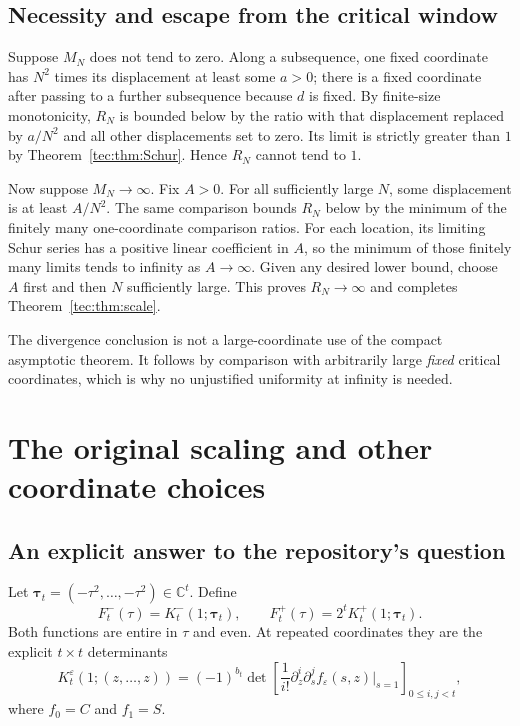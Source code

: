 \documentclass[11pt,a4paper]{article}
\numberwithin{equation}{section}
\theoremstyle{definition}
\theoremstyle{remark}
\newcommand{\CC}{\mathbb C}
\begin{document}
\subsection{Necessity and escape from the critical window}
Suppose $M_N$ does not tend to zero. Along a subsequence, one fixed
coordinate has $N^2$ times its displacement at least some $a>0$;
there is a fixed coordinate after passing to a further subsequence
because $d$ is fixed. By finite-size monotonicity, $R_N$ is bounded
below by the ratio with that displacement replaced by $a/N^2$ and
all other displacements set to zero. Its limit is strictly greater
than $1$ by Theorem~\ref{tec:thm:Schur}. Hence $R_N$ cannot tend to $1$.

Now suppose $M_N\to\infty$. Fix $A>0$. For all sufficiently large $N$,
some displacement is at least $A/N^2$. The same comparison bounds
$R_N$ below by the minimum of the finitely many one-coordinate comparison
ratios. For each location, its limiting Schur series has a positive
linear coefficient in $A$, so the minimum of those finitely many limits
tends to infinity as $A\to\infty$. Given any desired lower bound,
choose $A$ first and then $N$ sufficiently large. This proves
$R_N\to\infty$ and completes Theorem~\ref{tec:thm:scale}.

The divergence conclusion is not a large-coordinate use of the compact
asymptotic theorem. It follows by comparison with arbitrarily large
\emph{fixed} critical coordinates, which is why no unjustified uniformity
at infinity is needed.

\section{The original scaling and other coordinate choices}\label{tec:sec:original}
\subsection{An explicit answer to the repository's question}
Let $\boldsymbol\tau_t=(-\tau^2,\ldots,-\tau^2)\in\CC^t$. Define
\begin{equation}\label{tec:eq:Ft}
 F_t^-(\tau)=K_t^-(1;\boldsymbol\tau_t),\qquad
 F_t^+(\tau)=2^t K_t^+(1;\boldsymbol\tau_t).
\end{equation}
Both functions are entire in $\tau$ and even. At repeated coordinates
they are the explicit $t\times t$ determinants
\begin{equation}\label{tec:eq:repeatedkernel}
 K_t^\varepsilon(1;(z,\ldots,z))
 =(-1)^{b_t}\det\left[
 \frac1{i!}\partial_z^i\partial_s^j f_\varepsilon(s,z)
 \bigg|_{s=1}\right]_{0\le i,j<t},
\end{equation}
where $f_0=C$ and $f_1=S$.
\end{document}
